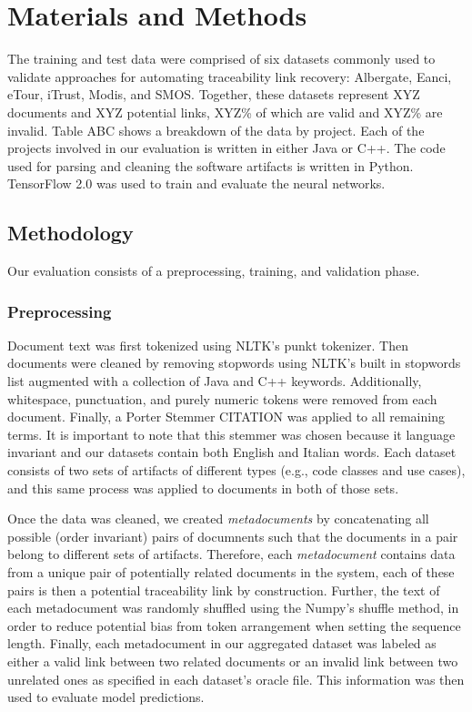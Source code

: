 \documentclass{article}
\begin{document}
\section{Materials and Methods}
    The training and test data were comprised of six datasets commonly used to validate approaches for automating traceability link recovery: Albergate, Eanci, eTour, iTrust, Modis, and SMOS. Together, these datasets represent XYZ documents and XYZ potential links, XYZ\% of which are valid and XYZ\% are invalid. Table ABC shows a breakdown of the data by project. Each of the projects involved in our evaluation is written in either Java or C++. The code used for parsing and cleaning the software artifacts is written in Python. TensorFlow 2.0 was used to train and evaluate the neural networks. 
    
    
    
\subsection{Methodology}
	Our evaluation consists of a preprocessing, training, and validation phase.
	
\subsubsection{Preprocessing}
    Document text was first tokenized using NLTK's\citep{BirdKleinLoper09} punkt tokenizer. Then documents were cleaned by removing stopwords using NLTK's built in stopwords list augmented with a collection of Java and C++ keywords. Additionally, whitespace, punctuation, and purely numeric tokens were removed from each document. Finally, a Porter Stemmer CITATION was applied to all remaining terms. It is important to note that this stemmer was chosen because it language invariant and our datasets contain both English and Italian words. Each dataset consists of two sets of artifacts of different types (e.g., code classes and use cases), and this same process was applied to documents in both of those sets. 
    
    Once the data was cleaned, we created \textit{metadocuments} by concatenating all possible (order invariant) pairs of documnents such that the documents in a pair belong to different sets of artifacts. Therefore, each \textit{metadocument} contains data from a unique pair of potentially related documents in the system, each of these pairs is then a potential traceability link by construction. Further, the text of each metadocument was randomly shuffled using the Numpy's\citep{harris2020array} shuffle method, in order to reduce potential bias from token arrangement when setting the sequence length. Finally, each metadocument in our aggregated dataset was labeled as either a valid link between two related documents or an invalid link between two unrelated ones as specified in each dataset's oracle file. This information was then used to evaluate model predictions.
\end{document}
